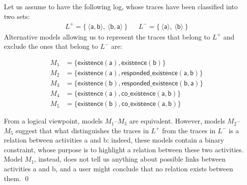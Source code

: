\begin{example}
\label{ex:unaryVsBinary}
Let us assume %
 to have the following log, whose traces have been classified into two sets:
%
\begin{align*}
L^+  = \{\ \langle \mathsf{a}, \mathsf{b}\rangle,\ \langle \mathsf{b}, \mathsf{a} \rangle \ \} && 
L^-  = \{\ \langle \mathsf{a}\rangle,\ \langle \mathsf{b} \rangle \ \}
\end{align*}
%
Alternative models allowing us to represent the traces that belong to $L^+$ %
and exclude the ones that belong to $L^-$ %
are:%


{\small{\begin{align*}
M_1 & = \{ \mathsf{existence(a),existence(b)}\}\\
M_2 & = \{ \mathsf{existence(a), responded\_existence(a, b)}\} \\
M_3 & = \{ \mathsf{existence(b), responded\_existence(b, a)}\} \\
M_4 & = \{ \mathsf{existence(a), co\_existence(a, b)}\} \\
M_5 & = \{ \mathsf{existence(b), co\_existence(a, b)}\}
\end{align*}}}
%

From a %
 logical viewpoint, models $M_1$--$M_5$ %
 are equivalent. However, models  $M_2$--$M_5$ %
 suggest that what distinguishes the traces in $L^+$ from the traces in $L^-$  
 is a relation between activities \textsf{a} and \textsf{b}: indeed, these models contain a binary constraint, whose purpose is to highlight a relation between these two activities. %
 Model $M_1$, %
 instead, does not tell us anything about possible links between activities \textsf{a} and \textsf{b}, and a user might conclude that no relation exists between them.%
\qed
\end{example}

